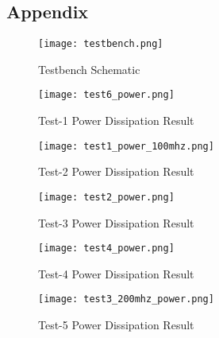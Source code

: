 \documentclass[12pt]{article}
\begin{document}
\begin{landscape}

\pagestyle{empty}
\subsection*{Appendix}

\begin{figure}[H]
\centering
\texttt{[image: testbench.png]}
\caption{Testbench Schematic}
\label{tb}
\end{figure}


\begin{figure}[H]
\centering
\texttt{[image: test6\_power.png]}
\caption{Test-1 Power Dissipation Result}
\label{test6_power}
\end{figure}



\begin{figure}[H]
\centering
\texttt{[image: test1\_power\_100mhz.png]}
\caption{Test-2 Power Dissipation Result}
\label{test1_power}
\end{figure}


\begin{figure}[H]
\centering
\texttt{[image: test2\_power.png]}
\caption{Test-3 Power Dissipation Result}
\label{test2_power}
\end{figure}



\begin{figure}[H]
\centering
\texttt{[image: test4\_power.png]}
\caption{Test-4 Power Dissipation Result}
\label{test4_power}
\end{figure}

\begin{figure}[H]
\centering
\texttt{[image: test3\_200mhz\_power.png]}
\caption{Test-5 Power Dissipation Result}
\label{test3_power}
\end{figure}


\end{landscape}
\end{document}
